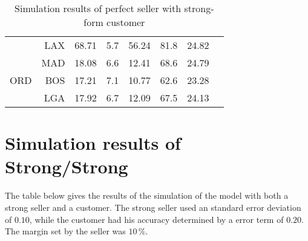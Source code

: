 \begin{table}[h]
\begin{center}
\begin{tabular}{l r c c c c c c}
     &  LAX &   68.71  &     5.7  &   56.24  &    81.8  &   24.82  \\
     &  MAD &   18.08  &     6.6  &   12.41  &    68.6  &   24.79  \\[.5ex]
ORD  &  BOS &   17.21  &     7.1  &   10.77  &    62.6  &   23.28  \\
     &  LGA &   17.92  &     6.7  &   12.09  &    67.5  &   24.13  \\
            \bottomrule
        \end{tabular}
        \caption{Simulation results of perfect seller with strong-form customer}
        \label{tbl:resultsPerfectStrong}
    \end{center}
\end{table}



\chapter{Simulation results of Strong/Strong}
\label{app:SimulationResultsStrongStrong}
The table below gives the results of the simulation of the model with both a strong seller and a customer. The strong seller used an standard error deviation of $0.10$, while the customer had his accuracy determined by a error term of $0.20$. The margin set by the seller was $10\,\%$.

